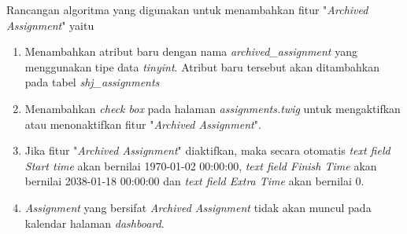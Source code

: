 Rancangan algoritma yang digunakan untuk menambahkan fitur "\textit{Archived Assignment}" yaitu
\begin{enumerate}
	\item Menambahkan atribut baru dengan nama \textit{archived\_assignment} yang menggunakan tipe data \textit{tinyint}. Atribut baru tersebut akan ditambahkan pada tabel \textit{shj\_assignments}
	\item Menambahkan \textit{check box} pada halaman \textit{assignments.twig} untuk mengaktifkan atau menonaktifkan fitur "\textit{Archived Assignment}".
	\item Jika fitur "\textit{Archived Assignment}" diaktifkan, maka secara otomatis \textit{text field Start time} akan bernilai 1970-01-02 00:00:00, \textit{text field Finish Time} akan bernilai 2038-01-18 00:00:00 dan \textit{text field Extra Time} akan bernilai 0.
	\item \textit{Assignment} yang bersifat \textit{Archived Assignment} tidak akan muncul pada kalendar halaman \textit{dashboard}.
\end{enumerate}

